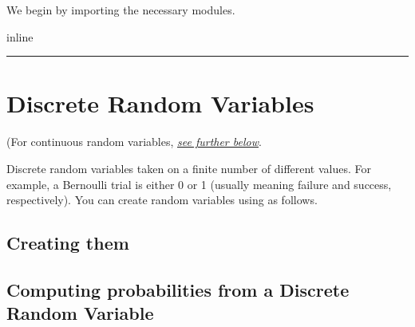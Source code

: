 \documentclass[letterpaper,10pt,english]{jupyterBook}
\begin{document}
\sphinxAtStartPar
We begin by importing the necessary modules.

\begin{sphinxVerbatim}[commandchars=\\\{\}]
   
   
   
   
   
 inline
\end{sphinxVerbatim}


\bigskip\hrule\bigskip



\section{Discrete Random Variables}
\label{\detokenize{GB213-review-in-Python:discrete-random-variables}}
\sphinxAtStartPar
(For continuous random variables, {\hyperref[\detokenize{GB213-review-in-Python:continuous-random-variables}]{\emph{see further below}}}.

\sphinxAtStartPar
Discrete random variables taken on a finite number of different values.  For example, a Bernoulli trial is either 0 or 1 (usually meaning failure and success, respectively).  You can create random variables using  as follows.


\subsection{Creating them}
\label{\detokenize{GB213-review-in-Python:creating-them}}
\begin{sphinxVerbatim}[commandchars=\\\{\}]
      
        
\end{sphinxVerbatim}


\subsection{Computing probabilities from a Discrete Random Variable}
\label{\detokenize{GB213-review-in-Python:computing-probabilities-from-a-discrete-random-variable}}
\begin{sphinxVerbatim}[commandchars=\\\{\}]
       
\end{sphinxVerbatim}
\end{document}
